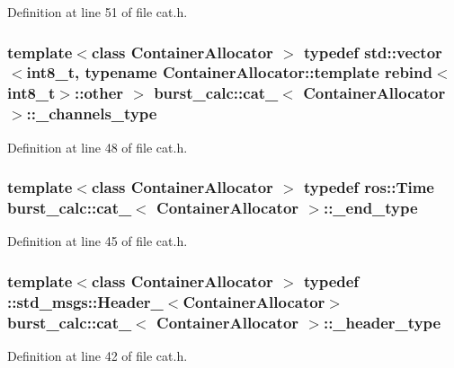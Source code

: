\-Definition at line 51 of file cat.\-h.

\subsubsection[{\-\_\-channels\-\_\-type}]{\setlength{\rightskip}{0pt plus 5cm}template$<$class Container\-Allocator $>$ typedef std\-::vector$<$int8\-\_\-t, typename \-Container\-Allocator\-::template rebind$<$int8\-\_\-t$>$\-::other $>$ {\bf burst\-\_\-calc\-::cat\-\_\-}$<$ \-Container\-Allocator $>$\-::{\bf \-\_\-channels\-\_\-type}}\label{structburst__calc_1_1cat___acd73ea68fd2b3586cf79fd33043a4cef}


\-Definition at line 48 of file cat.\-h.

\subsubsection[{\-\_\-end\-\_\-type}]{\setlength{\rightskip}{0pt plus 5cm}template$<$class Container\-Allocator $>$ typedef ros\-::\-Time {\bf burst\-\_\-calc\-::cat\-\_\-}$<$ \-Container\-Allocator $>$\-::{\bf \-\_\-end\-\_\-type}}\label{structburst__calc_1_1cat___a65b318a8870a26fea3af29e87e41c0ab}


\-Definition at line 45 of file cat.\-h.

\subsubsection[{\-\_\-header\-\_\-type}]{\setlength{\rightskip}{0pt plus 5cm}template$<$class Container\-Allocator $>$ typedef \-::std\-\_\-msgs\-::\-Header\-\_\-$<$\-Container\-Allocator$>$ {\bf burst\-\_\-calc\-::cat\-\_\-}$<$ \-Container\-Allocator $>$\-::{\bf \-\_\-header\-\_\-type}}\label{structburst__calc_1_1cat___a034c952902181e3acd79465d8e3403e0}


\-Definition at line 42 of file cat.\-h.

